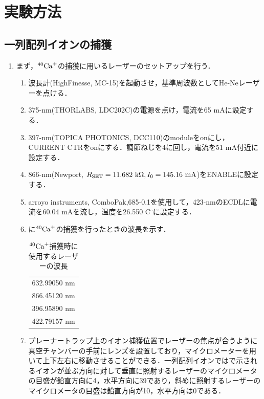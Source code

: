\chapter{実験方法}
\section{一列配列イオンの捕獲}
\begin{enumerate}
\item まず，$^{40}{\rm Ca}^+$の捕獲に用いるレーザーのセットアップを行う．
\begin{enumerate}
\item 波長計(HighFinesse, MC-15)を起動させ，基準周波数としてHe-Neレーザーを点ける．
\item 375-nm(THORLABS, LDC202C)の電源を点け，電流を65 mAに設定する．
\item 397-nm(TOPICA PHOTONICS, DCC110)のmoduleをonにし，CURRENT CTRをonにする．調節ねじを4に回し，電流を51 mA付近に設定する．
\item 866-nm(Newport, $R_{\rm SET} = 11.682 \ {\rm k}\Omega , I_{0} = 145.16 \ {\rm mA}$)をENABLEに設定する．
\item arroyo instruments, ComboPak,685-0.1を使用して，423-nmのECDLに電流を60.04 mAを流し，温度を26.550 C$^{\circ}$に設定する．
\item {}に$^{40}{\rm Ca}^+$の捕獲を行ったときの波長を示す．

\begin{table}[h]
	\centering
		\caption{$^{40}{\rm Ca}^+$捕獲時に使用するレーザーの波長}
		\label{tab:use_laser_wavelength}
		\begin{tabular}{c}\hline \hline
			632.99050 nm \\
			866.45120 nm \\
			396.95890 nm \\
			422.79157 nm \\ \hline
		\end{tabular}
\end{table}

\item プレーナートラップ上のイオン捕獲位置でレーザーの焦点が合うように真空チャンバーの手前にレンズを設置しており，マイクロメーターを用いて上下左右に移動させることができる．一列配列イオンではで示されるイオンが並ぶ方向に対して垂直に照射するレーザーのマイクロメータの目盛が鉛直方向に4，水平方向に39であり，斜めに照射するレーザーのマイクロメータの目盛は鉛直方向が10，水平方向は0である．


\end{enumerate}
\end{enumerate}

